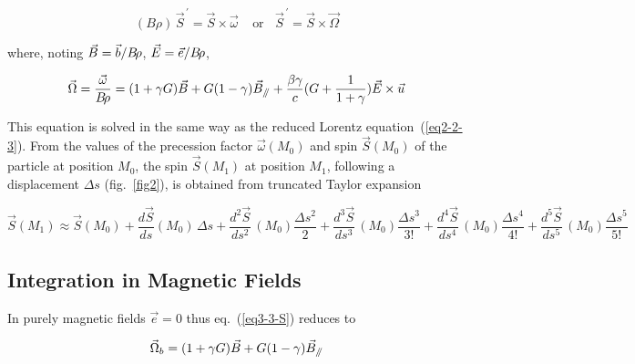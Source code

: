 
 \begin{equation}
    (B\rho) \, \vec S^{\,\prime}  = \vec  S \times  \vec  \omega ~ ~ ~ ~ ~ \textrm{or} ~ ~ ~ ~ 
    \vec S^{\,\prime}  = \vec  S \times  \vec  \Omega
 	\label{eq3-4-S}
 \end{equation}
 
\noindent where, noting $\vec B = \vec b/B\!\rho$, $\vec E = \vec e/B\!\rho$,

\begin{equation}
	\vec  \Omega  = \dfrac{\vec \omega }{ B\!\rho}  = (1+\gamma G)\vec  B +
	G(1-\gamma )\vec  B_{\mathrel{/\kern-.25em/}} + \dfrac{\beta \gamma}{c}(G + \dfrac{1}{1+\gamma}) \vec E \times \vec u  
	\label{eq3-3-S}
\end{equation}

\noindent This equation is solved in the same way as the reduced Lorentz equation~(\ref{eq2-2-3}). 
From the values of the  precession factor $ \vec  \omega (M_0) $ and spin $\vec  S(M_0) $ 
of the particle at position $ M_0 $, the spin $ \vec  S(M_1)$ 
at position $ M_1 $, following a displacement $ \Delta s$ (fig.~\ref{fig2}), is obtained from truncated 
Taylor expansion 

 \begin{equation}
	 \vec  S(M_1) \approx \vec  S(M_0)+ \dfrac{d\vec  S }{ ds} (M_0)\, \Delta s
	 + \dfrac{d^2\vec  S }{ds^2} \,(M_0) \dfrac{\Delta s^2 }{ 2} 
	 + \dfrac{d^3\vec  S }{ ds^3} \,(M_0) \dfrac{\Delta s^3 }{ 3!}
	+ \dfrac{d^4\vec  S }{ ds^4}\, (M_0) \dfrac{\Delta s^4 }{ 4!}
	+ \dfrac{d^5\vec  S }{ ds^5}\, (M_0) \dfrac{\Delta s^5 }{ 5!}
 	\label{eq3-5-S}
 \end{equation}
 


\subsection{Integration in Magnetic Fields} \label{secSpin.2.1}  

In purely magnetic fields  $ \vec  e=0 $ thus eq.~(\ref{eq3-3-S}) reduces to

 \begin{equation}
 \vec \Omega_b = (1+\gamma G)\vec  B + G(1-\gamma )\vec  B_{\mathrel{/\kern-.25em/}} 
 \label{eq3-2-B}  
\end{equation}


